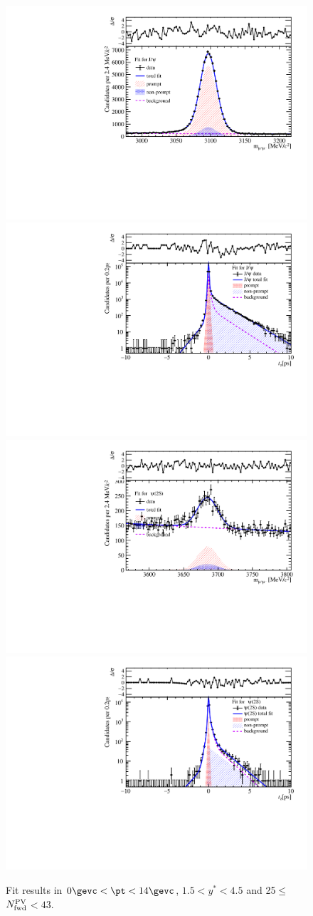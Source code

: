 \begin{figure}[H]
\begin{center}
\includegraphics[width=0.45\linewidth]{pdf/Pbp/FWorkdir/TwoDimFit/ProjMass/Jpsi_n2y1pt1.pdf}
\includegraphics[width=0.45\linewidth]{pdf/Pbp/FWorkdir/TwoDimFit/ProjTz/Jpsi_n2y1pt1.pdf}
\vspace*{-0.5cm}
\includegraphics[width=0.45\linewidth]{pdf/Pbp/FWorkdir/TwoDimFit/ProjMass/Psi2S_n2y1pt1.pdf}
\includegraphics[width=0.45\linewidth]{pdf/Pbp/FWorkdir/TwoDimFit/ProjTz/Psi2S_n2y1pt1.pdf}
\vspace*{-0.5cm}
\end{center}
\caption{Fit results in $0\gevc<\pt<14\gevc$, $1.5<y^*<4.5$ and 25$\leq$$N_{\rm fwd}^{\rm PV}$$<43$.}
\end{figure}
